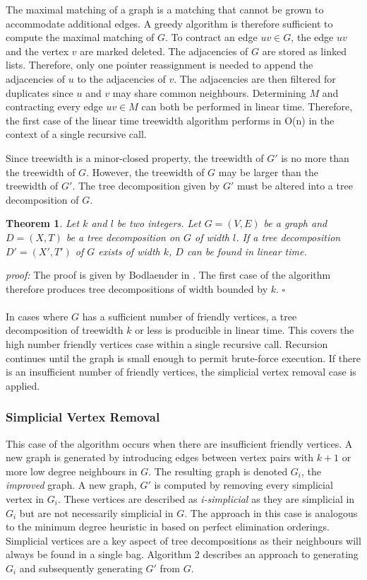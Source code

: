 \documentclass[12pt,conference]{IEEEtran}
\theoremstyle{plain}
\newtheorem{theorem}{Theorem}
\begin{document}
The maximal matching of a graph is a matching that cannot be grown to accommodate additional edges. A greedy algorithm is therefore sufficient to compute the maximal matching of $G$. To contract an edge $uv \in G$, the edge $uv$ and the vertex $v$ are marked deleted. The adjacencies of $G$ are stored as linked lists. Therefore, only one pointer reassignment is needed to append the adjacencies of $u$ to the adjacencies of $v$. The adjacencies are then filtered for duplicates since $u$ and $v$ may share common neighbours. Determining $M$ and contracting every edge $uv \in M$ can both be performed in linear time. Therefore, the first case of the linear time treewidth algorithm performs in O(n) in the context of a single recursive call.

Since treewidth is a minor-closed property, the treewidth of $G'$ is no more than the treewidth of $G$. However, the treewidth of $G$ may be larger than the treewidth of $G'$. The tree decomposition given by $G'$ must be altered into a tree decomposition of $G$. 

\begin{theorem}
  Let $k$ and $l$ be two integers. Let $G=(V,E)$ be a graph and $D=(X,T)$ be a tree decomposition on $G$ of width $l$. If a tree decomposition $D'=(X',T')$ of $G$ exists of width $k$, $D$ can be found in linear time.
\end{theorem}

\textit{proof:} The proof is given by Bodlaender in \cite{treewidth-value-reduction}. The first case of the algorithm therefore produces tree decompositions of width bounded by $k$. $\square$
\\
\\
In cases where $G$ has a sufficient number of friendly vertices, a tree decomposition of treewidth $k$ or less is producible in linear time. This covers the high number friendly vertices case within a single recursive call. Recursion continues until the graph is small enough to permit brute-force execution. If there is an insufficient number of friendly vertices, the simplicial vertex removal case is applied.

\subsubsection{Simplicial Vertex Removal}

This case of the algorithm occurs when there are insufficient friendly vertices. A new graph is generated by introducing edges between vertex pairs with $k+1$ or more low degree neighbours in $G$. The resulting graph is denoted $G_{i}$, the \textit{improved} graph. A new graph, $G'$ is computed by removing every simplicial vertex in $G_{i}$. These vertices are described as \textit{i-simplicial} as they are simplicial in $G_{i}$ but are not necessarily simplicial in $G$. The approach in this case is analogous to the minimum degree heuristic in \cite{min-degree-upper-bound} based on perfect elimination orderings. Simplicial vertices are a key aspect of tree decompositions as their neighbours will always be found in a single bag. Algorithm 2 describes an approach to generating $G_{i}$ and subsequently generating $G'$ from $G$.
\end{document}
